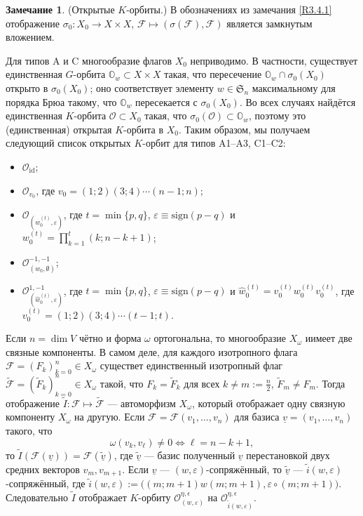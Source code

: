 \documentclass{amsart}
\theoremstyle{definition}
\newtheorem{remark}{Замечание}
\begin{document}
\begin{remark}
	
	(Открытые $K$-орбиты.)
\label{R-open}
	В обозначениях из замечания \ref{R3.4.1} отображение $\sigma_0:X_0\to X\times X$, $\mathcal{F}\mapsto(\sigma(\mathcal{F}),\mathcal{F})$ является замкнутым вложением.

Для типов A и C многообразие флагов $X_0$ неприводимо.
В частности, существует единственная $G$-орбита $\mathbb{O}_w\subset X\times X$
такая, что пересечение $\mathbb{O}_w\cap \sigma_0(X_0)$ открыто в $\sigma_0(X_0)$;
оно соответствует элементу $w\in\mathfrak{S}_n$ максимальному для порядка Брюа такому, что $\mathbb{O}_w$ пересекается с $\sigma_0(X_0)$.
Во всех случаях найдётся единственная  $K$-орбита $\mathcal{O}\subset X_0$ такая, что $\sigma_0(\mathcal{O})\subset\mathbb{O}_w$, поэтому это (единственная) открытая $K$-орбита в $X_0$.
Таким образом, мы получаем следующий список открытых $K$-орбит для типов A1--A3, C1--C2:
\begin{itemize}
\item[\rm A1:] $\mathcal{O}_\mathrm{id}$;
\item[\rm A2:] $\mathcal{O}_{v_0}$, где $v_0=(1;2)(3;4)\cdots(n-1;n)$;
\item[\rm A3:] $\mathcal{O}_{(w_0^{(t)},\varepsilon)}$, где
$t=\min\{p,q\}$, $\varepsilon\equiv\mathrm{sign}(p-q)$
и $w^{(t)}_0=\prod\limits_{k=1}^t(k;n-k+1)$;
\item[\rm C1:] $\mathcal{O}^{-1,-1}_{(w_0,\emptyset)}$;
\item[\rm C2:] $\mathcal{O}^{1,-1}_{(\hat{w}_0^{(t)},\varepsilon)}$,
где $t=\min\{p,q\}$, $\varepsilon\equiv\mathrm{sign}(p-q)$ и $\hat{w}_0^{(t)}=v_0^{(t)}w_0^{(t)}v_0^{(t)}$,
где $v_0^{(t)}=(1;2)(3;4)\cdots(t-1;t)$.
\end{itemize}

Если $n=\dim V$ чётно и форма $\omega$ ортогональна, то многообразие $X_\omega$ иимеет две связные компоненты.
В самом деле, для каждого изотропного флага $\mathcal{F}=(F_k)_{k=0}^n\in X_\omega$ существет единственный изотропный флаг $\tilde{\mathcal{F}}=(\tilde{F}_k)_{k=0}^n\in X_\omega$
такой, что $F_k=\tilde{F}_k$ для всех $k\not=m:=\frac{n}{2}$, $\tilde{F}_m\not=F_m$.
Тогда отображение $\tilde{I}:\mathcal{F}\mapsto\tilde{\mathcal{F}}$ --- автоморфизм
 $X_\omega$, который отображает одну связную компоненту $X_\omega$ на другую.
Если $\mathcal{F}=\mathcal{F}(v_1,\ldots,v_n)$ для базиса $\underline{v}=(v_1,\ldots,v_n)$ такого, что
\[\omega(v_k,v_\ell)\not=0\Leftrightarrow \ell=n-k+1,\]
то
$\tilde{I}(\mathcal{F}(\underline{v}))=\mathcal{F}(\underline{\tilde{v}})$,
где $\underline{\tilde{v}}$ --- базис полученный $\underline{v}$ перестановкой двух средних векторов $v_m,v_{m+1}$.
Если $\underline{v}$ --- $(w,\varepsilon)$-сопряжённый, то $\underline{\tilde{v}}$ --- $\tilde{i}(w,\varepsilon)$-сопряжённый, где
$\tilde{i}(w,\varepsilon):=\big((m;m+1)w(m;m+1),\varepsilon\circ(m;m+1)\big)$.
Следовательно $\tilde{I}$ отображает  $K$-орбиту $\mathcal{O}^{\eta,\epsilon}_{(w,\varepsilon)}$
на $\mathcal{O}^{\eta,\epsilon}_{\tilde{i}(w,\varepsilon)}$.


\end{remark}
\end{document}
